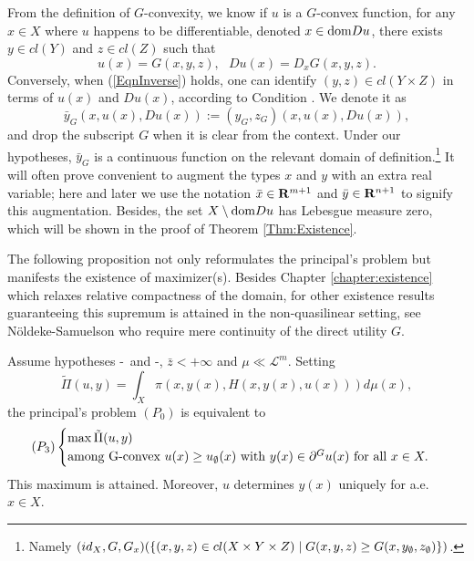 									
	From the definition of $G$-convexity, we know if $u$ is a $G$-convex function, for any $x \in X$ where $u$ happens
	to be differentiable,  denoted $x\in {\mathop{\rm dom}} Du$, there exists $y\in cl(Y)$ and $z\in cl(Z)$ such that
	\begin{equation}\label{EqnInverse}
	u(x)= G(x, y, z),\ \ \   Du(x) = D_x G(x, y, z).
	\end{equation}
	Conversely, when (\ref{EqnInverse}) holds, one can identify $(y, z) \in cl( Y \times Z)$ in terms of $u(x)$ and $Du(x)$, according to Condition \Gone. We denote it as 
	\begin{equation*}
	\bar{y}_G (x,u(x),Du(x)) := (y_G, z_G)(x,u(x),Du(x)),
	\end{equation*} 
	and drop the subscript
	$G$ when it is clear from the context. 
	Under our hypotheses, $\bar y_G$ is a continuous function 
	on the relevant domain of 
		definition.\footnote{Namely $(id_X, G, G_x)(\{(x,y,z) \in cl(X \times Y \times Z) \mid G(x,y,z) \ge G(x,y_{\emptyset},z_{\emptyset})\})$.}
	It will often prove convenient to augment the types $x$ and $y$ with an extra real variable;
	here and later we use the notation $\bar x \in {\mathbf R}^{m+1}$ and $\bar y \in {\mathbf R}^{n+1}$ to signify this augmentation.
	Besides, the set $X\setminus {\mathop{\rm dom}} Du$ has Lebesgue measure zero, which will be shown in the proof of Theorem \ref{Thm:Existence}.	\medskip
									
									
									
									
									
The following proposition not only reformulates the principal's problem but manifests the existence of maximizer(s). 
Besides Chapter \ref{chapter:existence} 
which relaxes relative compactness of the domain, for other existence results guaranteeing this supremum is attained in the non-quasilinear setting, 
see N\" oldeke-Samuelson \cite{NoldekeSamuelson15p} who require mere continuity of the direct utility $G$.\medskip
									

\begin{theorem}\label{Thm:Existence}
	Assume hypotheses \Gzero-\Gone ~and \Gfour-\Gfive, 
	$\bar z < +\infty$  and $\mu \ll \mathcal{L}^m$. Setting  $$\tilde{\Pi}(u,y)=\int_{X} \pi(x, y(x), H(x,y(x), u(x))) d\mu(x),$$
	the principal's problem $(P_0)$ is equivalent to
		\begin{equation*}
			(P_3)
			\begin{cases}
				\max \tilde{\Pi}(u,y) \\
				\text{\rm among }
				$G$\text{\rm-convex  $u(x) \ge u_\nul(x)$ with }
				y(x) \in \partial^G u(x)\ \text{\rm for all } x \in X.
			\end{cases}
		\end{equation*}
	This maximum is attained. Moreover, $u$ determines $y(x)$ uniquely for a.e. $x \in X$.
\end{theorem}
										
